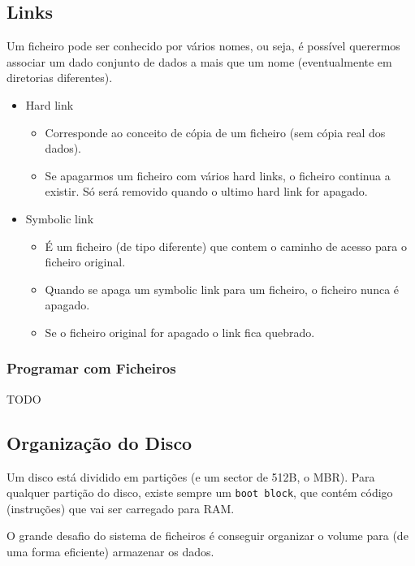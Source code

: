 \documentclass[11pt]{article}
\begin{document}
\subsection{Links}

Um ficheiro pode ser conhecido por vários nomes, ou seja, é possível querermos associar um dado conjunto de dados a mais que um nome (eventualmente em diretorias diferentes).

\begin{itemize}
    \item Hard link
          \begin{itemize}
              \item Corresponde ao conceito de cópia de um ficheiro (sem cópia real dos dados).
              \item Se apagarmos um ficheiro com vários hard links, o ficheiro continua a existir. Só será removido quando o ultimo hard link for apagado.
          \end{itemize}
    \item Symbolic link
          \begin{itemize}
              \item É um ficheiro (de tipo diferente) que contem o caminho de acesso para o ficheiro original.
              \item Quando se apaga um symbolic link para um ficheiro, o ficheiro nunca é apagado.
              \item Se o ficheiro original for apagado o link fica quebrado.
          \end{itemize}
\end{itemize}

\subsubsection{Programar com Ficheiros}

TODO

\subsection{Organização do Disco}

Um disco está dividido em partições (e um sector de 512B, o MBR). Para qualquer partição do disco, existe sempre um \lstinline|boot block|, que contém código (instruções) que vai ser carregado para RAM.

O grande desafio do sistema de ficheiros é conseguir organizar o volume para (de uma forma eficiente) armazenar os dados.
\end{document}
